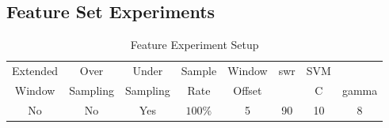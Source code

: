 





\subsection{Feature Set Experiments}
\label{sec:svm_feature_set_experiments}


\begin{table}[h]
\begin{center}

    \begin{tabular}{|c|c|c|c|c|c|cc|}
        \hline
        Extended & Over & Under & Sample & Window & \gls{swr} & SVM & \\
        Window & Sampling & Sampling & Rate & Offset &  & C & gamma \\ \hline
        No & No & Yes & $100\%$ & 5 & 90 & 10 & 8 \\ \hline
    \end{tabular}
    \caption{Feature Experiment Setup}
    \label{tab:svm_feature_experiment_setup}
\end{center}

\end{table}

